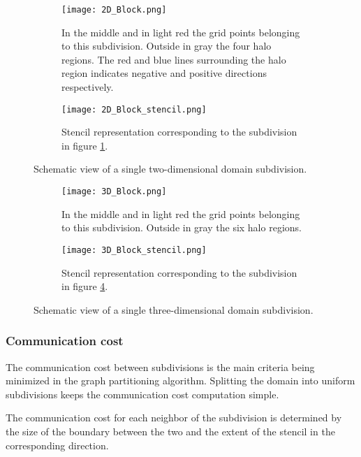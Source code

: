 \begin{figure}[!htbp]
\centering
\begin{subfigure}{0.8\textwidth}
  \centering
  \texttt{[image: 2D\_Block.png]}
  \caption{In the middle and in light red the grid points belonging to this subdivision.
Outside in gray the four halo regions.
The red and blue lines surrounding the halo region indicates negative and positive directions respectively.}
  \label{fig:2DBlock}
\end{subfigure}%
\begin{subfigure}{0.2\textwidth}
  \centering
  \texttt{[image: 2D\_Block\_stencil.png]}
  \caption{Stencil representation corresponding to the subdivision in figure \ref{fig:2DBlock}.}
  \label{fig:2DBlockStencil}
\end{subfigure}
\caption{Schematic view of a single two-dimensional domain subdivision.}
\label{fig:2D_subdivision}
\end{figure}

\begin{figure}[!htbp]
\centering
\begin{subfigure}{0.8\textwidth}
  \centering
  \texttt{[image: 3D\_Block.png]}
  \caption{In the middle and in light red the grid points belonging to this subdivision.
Outside in gray the six halo regions.}
  \label{fig:3DBlock}
\end{subfigure}%
\begin{subfigure}{0.2\textwidth}
  \centering
  \texttt{[image: 3D\_Block\_stencil.png]}
  \caption{Stencil representation corresponding to the subdivision in figure \ref{fig:3DBlock}.}
  \label{fig:3DBlockStencil}
\end{subfigure}
\caption{Schematic view of a single three-dimensional domain subdivision.}
\label{fig:3D_subdivision}
\end{figure}

\subsubsection{Communication cost}
\label{sec:commcost}
The communication cost between subdivisions is the main criteria being minimized in the graph partitioning algorithm.
Splitting the domain into uniform subdivisions keeps the communication cost computation simple.

The communication cost for each neighbor of the subdivision is determined by the size of the boundary between the two and the extent of the stencil in the corresponding direction.


